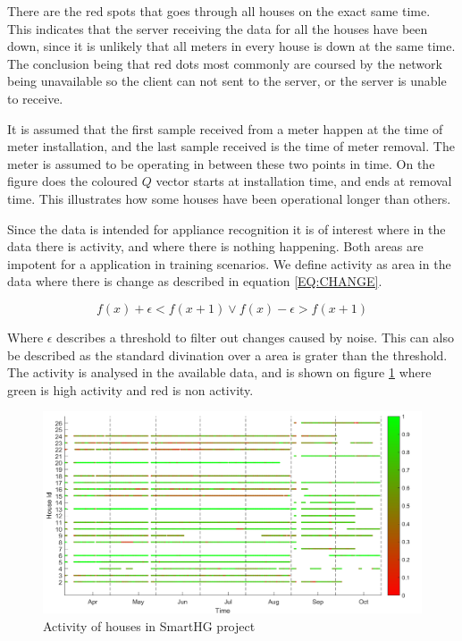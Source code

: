 There are the red spots that goes through all houses on the exact same time. This indicates that the server receiving the data for all the houses have been down, since it is unlikely that all meters in every house is down at the same time. The conclusion being that red dots most commonly are coursed by the network being unavailable so the client can not sent to the server, or the server is unable to receive. 

It is assumed that the first sample received from a meter happen at the time of meter installation, and the last sample received is the time of meter removal. The meter is assumed to be operating in between these two points in time. On the figure does the coloured $Q$ vector starts at installation time, and ends at removal time. This illustrates how some houses have been operational longer than others. 

Since the data is intended for appliance recognition it is of interest where in the data there is activity, and where there is nothing happening. Both areas are impotent for a  application in training scenarios. We define activity as area in the data where there is change as described in equation \ref{EQ:CHANGE}.

\begin{equation}
f(x) + \epsilon < f(x+1) \vee f(x) - \epsilon > f(x+1)
\label{EQ:CHANGE}
\end{equation}

Where $\epsilon$ describes a threshold to filter out changes caused by noise. This can also be described as the standard divination over a area is grater than the threshold. The activity is analysed in the available data, and is shown on figure \ref{fig:ActivityMap} where green is high activity and red is non activity. 

\begin{figure}[H]
\centering
\includegraphics[width=1\textwidth]{billeder/ActivityBig.png}
\caption{Activity of houses in SmartHG project}
\label{fig:ActivityMap}
\end{figure}

